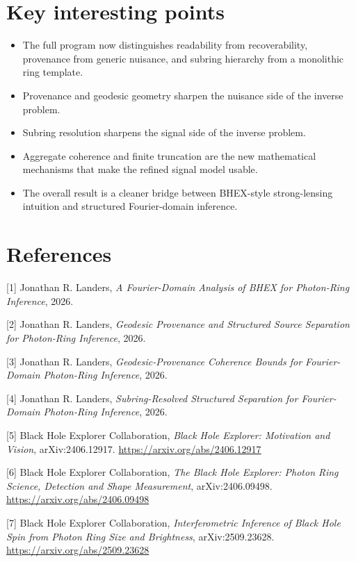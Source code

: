 \documentclass[10pt,letterpaper,twocolumn]{article}
\providecommand{\tightlist}{%
  \setlength{\itemsep}{0pt}\setlength{\parskip}{0pt}}
\begin{document}
\section{Key interesting points}

\begin{itemize}
\tightlist
\item The full program now distinguishes readability from recoverability, provenance from generic nuisance, and subring hierarchy from a monolithic ring template.
\item Provenance and geodesic geometry sharpen the nuisance side of the inverse problem.
\item Subring resolution sharpens the signal side of the inverse problem.
\item Aggregate coherence and finite truncation are the new mathematical mechanisms that make the refined signal model usable.
\item The overall result is a cleaner bridge between BHEX-style strong-lensing intuition and structured Fourier-domain inference.
\end{itemize}

\section*{References}

\noindent{}\hypertarget{ref-1}{}{[}1{]} Jonathan R. Landers,
\emph{A Fourier-Domain Analysis of BHEX for Photon-Ring Inference}, 2026.

\noindent{}\hypertarget{ref-2}{}{[}2{]} Jonathan R. Landers,
\emph{Geodesic Provenance and Structured Source Separation for Photon-Ring Inference}, 2026.

\noindent{}\hypertarget{ref-3}{}{[}3{]} Jonathan R. Landers,
\emph{Geodesic-Provenance Coherence Bounds for Fourier-Domain Photon-Ring Inference}, 2026.

\noindent{}\hypertarget{ref-4}{}{[}4{]} Jonathan R. Landers,
\emph{Subring-Resolved Structured Separation for Fourier-Domain Photon-Ring Inference}, 2026.

\noindent{}\hypertarget{ref-5}{}{[}5{]} Black Hole Explorer Collaboration,
\emph{Black Hole Explorer: Motivation and Vision}, arXiv:2406.12917.
\url{https://arxiv.org/abs/2406.12917}

\noindent{}\hypertarget{ref-6}{}{[}6{]} Black Hole Explorer Collaboration,
\emph{The Black Hole Explorer: Photon Ring Science, Detection and Shape Measurement},
arXiv:2406.09498. \url{https://arxiv.org/abs/2406.09498}

\noindent{}\hypertarget{ref-7}{}{[}7{]} Black Hole Explorer Collaboration,
\emph{Interferometric Inference of Black Hole Spin from Photon Ring Size and Brightness},
arXiv:2509.23628. \url{https://arxiv.org/abs/2509.23628}
\end{document}
